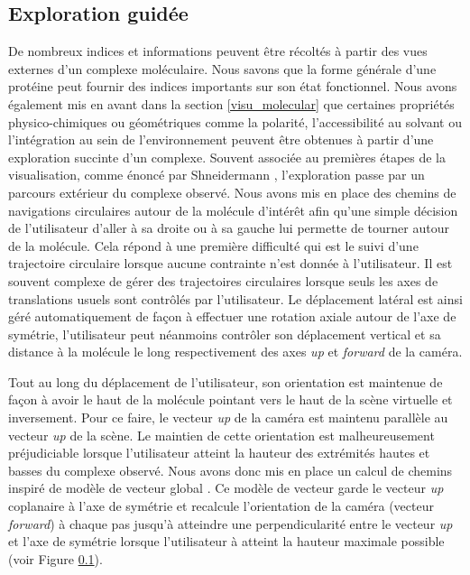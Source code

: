 \subsection{Exploration guidée}

De nombreux indices et informations peuvent être récoltés à partir des vues externes d'un complexe moléculaire. Nous savons que la forme générale d'une protéine peut fournir des indices importants sur son état fonctionnel. Nous avons également mis en avant dans la section \ref{visu_molecular} que certaines propriétés physico-chimiques ou géométriques comme la polarité, l'accessibilité au solvant ou l'intégration au sein de l'environnement peuvent être obtenues à partir d'une exploration succinte d'un complexe. Souvent associée au premières étapes de la visualisation, comme énoncé par Shneidermann \cite{shneiderman_eyes_1996}, l'exploration passe par un parcours extérieur du complexe observé. Nous avons mis en place des chemins de navigations circulaires autour de la molécule d'intérêt afin qu'une simple décision de l'utilisateur d'aller à sa droite ou à sa gauche lui permette de tourner autour de la molécule. Cela répond à une première difficulté qui est le suivi d'une trajectoire circulaire lorsque aucune contrainte n'est donnée à l'utilisateur. Il est souvent complexe de gérer des trajectoires circulaires lorsque seuls les axes de translations usuels sont contrôlés par l'utilisateur. Le déplacement latéral est ainsi géré automatiquement de façon à effectuer une rotation axiale autour de l'axe de symétrie, l'utilisateur peut néanmoins contrôler son déplacement vertical et sa distance à la molécule le long respectivement des axes \textit{up} et \textit{forward} de la caméra.

Tout au long du déplacement de l'utilisateur, son orientation est maintenue de façon à avoir le haut de la molécule pointant vers le haut de la scène virtuelle et inversement. Pour ce faire, le vecteur \textit{up} de la caméra est maintenu parallèle au vecteur \textit{up} de la scène. Le maintien de cette orientation est malheureusement préjudiciable lorsque l'utilisateur atteint la hauteur des extrémités hautes et basses du complexe observé. Nous avons donc mis en place un calcul de chemins inspiré de modèle de vecteur global \cite{khan_hovercam:_2005}. Ce modèle de vecteur garde le vecteur \textit{up} coplanaire à l'axe de symétrie et recalcule l'orientation de la caméra (vecteur \textit{forward}) à chaque pas jusqu'à atteindre une perpendicularité entre le vecteur \textit{up} et l'axe de symétrie lorsque l'utilisateur à atteint la hauteur maximale possible (voir Figure \ref{}).

